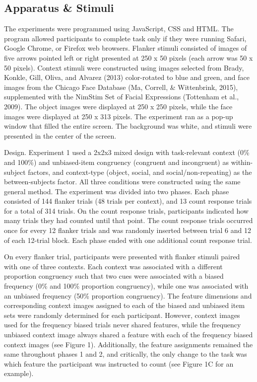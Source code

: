 \documentclass[english,,man,floatsintext]{apa6}
\begin{document}
\hypertarget{apparatus-stimuli}{%
\subsection{Apparatus \& Stimuli}\label{apparatus-stimuli}}

The experiments were programmed using JavaScript, CSS and HTML. The program allowed participants to complete task only if they were running Safari, Google Chrome, or Firefox web browsers. Flanker stimuli consisted of images of five arrows pointed left or right presented at 250 x 50 pixels (each arrow was 50 x 50 pixels). Context stimuli were constructed using images selected from Brady, Konkle, Gill, Oliva, and Alvarez (2013) color-rotated to blue and green, and face images from the Chicago Face Database (Ma, Correll, \& Wittenbrink, 2015), supplemented with the NimStim Set of Facial Expressions (Tottenham et al., 2009). The object images were displayed at 250 x 250 pixels, while the face images were displayed at 250 x 313 pixels. The experiment ran as a pop-up window that filled the entire screen. The background was white, and stimuli were presented in the center of the screen.

Design. Experiment 1 used a 2x2x3 mixed design with task-relevant context (0\% and 100\%) and unbiased-item congruency (congruent and incongruent) as within-subject factors, and context-type (object, social, and social/non-repeating) as the between-subjects factor.
All three conditions were constructed using the same general method. The experiment was divided into two phases. Each phase consisted of 144 flanker trials (48 trials per context), and 13 count response trials for a total of 314 trials. On the count response trials, participants indicated how many trials they had counted until that point. The count response trials occurred once for every 12 flanker trials and was randomly inserted between trial 6 and 12 of each 12-trial block. Each phase ended with one additional count response trial.

On every flanker trial, participants were presented with flanker stimuli paired with one of three contexts. Each context was associated with a different proportion congruency such that two cues were associated with a biased frequency (0\% and 100\% proportion congruency), while one was associated with an unbiased frequency (50\% proportion congruency). The feature dimensions and corresponding context images assigned to each of the biased and unbiased item sets were randomly determined for each participant. However, context images used for the frequency biased trials never shared features, while the frequency unbiased context image always shared a feature with each of the frequency biased context images (see Figure 1). Additionally, the feature assignments remained the same throughout phases 1 and 2, and critically, the only change to the task was which feature the participant was instructed to count (see Figure 1C for an example).
\end{document}
